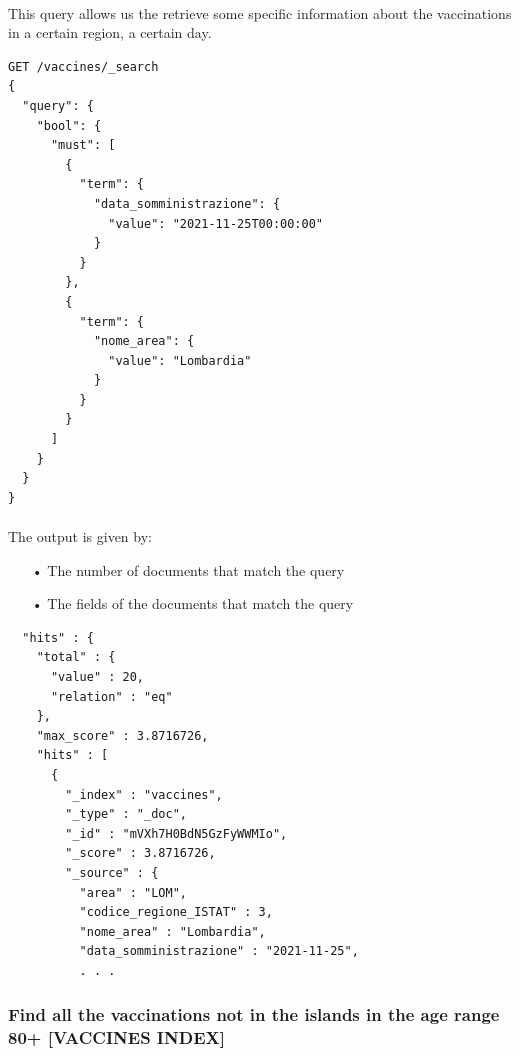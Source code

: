 \documentclass[a4paper,12pt]{article}
\begin{document}
\paragraph{} This query allows us the retrieve some specific information about the vaccinations in a certain region, a certain day.
\begin{tcolorbox}[colback=green!5!white,colframe=green!75!black,title=QUERY]
\begin{verbatim}
GET /vaccines/_search
{
  "query": {
    "bool": {
      "must": [
        {
          "term": {
            "data_somministrazione": {
              "value": "2021-11-25T00:00:00"
            }
          }
        },
        {
          "term": {
            "nome_area": {
              "value": "Lombardia"
            }
          }
        }
      ]
    }
  }
}
\end{verbatim}
\end{tcolorbox}
\paragraph{} The output is given by: 
\begin{itemize}[noitemsep]
\item[•] The number of documents that match the query
\item[•] The fields of the documents that match the query
\end{itemize}
\begin{tcolorbox}[colback=red!5!white,colframe=red!75!black,title=OUTPUT]
\begin{verbatim}
  "hits" : {
    "total" : {
      "value" : 20,
      "relation" : "eq"
    },
    "max_score" : 3.8716726,
    "hits" : [
      {
        "_index" : "vaccines",
        "_type" : "_doc",
        "_id" : "mVXh7H0BdN5GzFyWWMIo",
        "_score" : 3.8716726,
        "_source" : {
          "area" : "LOM",
          "codice_regione_ISTAT" : 3,
          "nome_area" : "Lombardia",
          "data_somministrazione" : "2021-11-25",
          . . .
\end{verbatim}
\end{tcolorbox}


\subsubsection{Find all the vaccinations not in the islands in the age range 80+ [VACCINES INDEX]}
\end{document}

